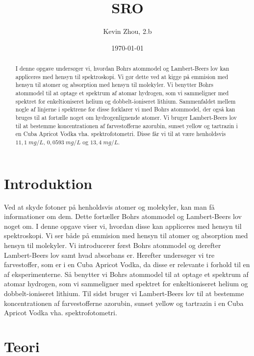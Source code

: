 \documentclass[11pt]{article}
\title{SRO}
\author{Kevin Zhou, 2.b}
\date{\today}
\theoremstyle{definition}
\begin{document}


\begin{abstract}
I denne opgave undersøger vi, hvordan Bohrs atommodel og Lambert-Beers lov kan appliceres med hensyn til spektroskopi.
Vi gør dette ved at kigge på emmision med hensyn til atomer og absorption med hensyn til molekyler.
Vi benytter Bohrs atommodel til at optage et spektrum af atomar hydrogen, som vi sammeligner med spektret for enkeltioniseret helium og dobbelt-ioniseret lithium.
Sammenfaldet mellem nogle af linjerne i spektrene for disse forklarer vi med Bohrs atommodel, der også kan bruges til at fortælle noget om hydrogenlignende atomer.
Vi bruger Lambert-Beers lov til at bestemme koncentrationen af farvestofferne azorubin, sunset yellow og tartrazin i en Cuba Apricot Vodka vha. spektrofotometri.
  Disse får vi til at være henholdsvis $11,1 \;\unit{mg/L}$, $0,0593 \;\unit{mg/L}$ og $13,4 \;\unit{mg/L} $. 
\end{abstract}

\tableofcontents
\thispagestyle{empty}
\newpage

\section{Introduktion} \label{intro}
Ved at skyde fotoner på henholdsvis atomer og molekyler, kan man få informationer om dem.
Dette fortæller Bohrs atommodel og Lambert-Beers lov noget om.
I denne opgave viser vi, hvordan disse kan appliceres med hensyn til spektroskopi.
Vi ser både på emmision med hensyn til atomer og absorption med hensyn til molekyler.
Vi introducerer først Bohrs atommodel og derefter Lambert-Beers lov samt hvad absorbans er.
Herefter undersøger vi tre farvestoffer, som er i en Cuba Apricot Vodka, da disse er relevante i forhold til en af eksperimenterne.
Så benytter vi Bohrs atommodel til at optage et spektrum af atomar hydrogen, som vi sammeligner med spektret for enkeltioniseret helium og dobbelt-ioniseret lithium.
Til sidst bruger vi Lambert-Beers lov til at bestemme koncentrationen af farvestofferne azorubin, sunset yellow og tartrazin i en Cuba Apricot Vodka vha. spektrofotometri.

\section{Teori}
\end{document}
